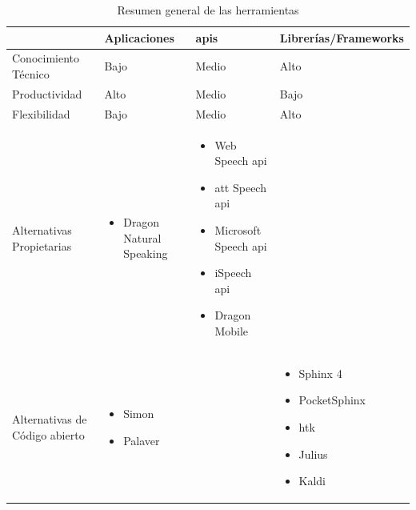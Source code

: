 \begin{table}[H]
\centering
\footnotesize
\begin{tabular}{|p{3.5cm}|>{\centering}p{3.5cm}|>{\centering}p{3.5cm}|>{\centering}p{3.5cm}|}
\hline
                               & Aplicaciones             &  \gls{api}s                            & Librer\'ias/Frameworks \tabularnewline
\hline
Conocimiento T\'ecnico         &     Bajo                    & Medio                            & Alto    \tabularnewline \hline
Productividad                  &     Alto                    & Medio                            & Bajo    \tabularnewline \hline
Flexibilidad                   &     Bajo                    & Medio                            & Alto    \tabularnewline \hline
Alternativas Propietarias      & \begin{itemize} \setlength{\itemsep}{1pt} \setlength{\parskip}{0pt} \setlength{\parsep}{0pt}\item Dragon Natural Speaking \end{itemize}  & \begin{itemize}  \setlength{\itemsep}{1pt} \setlength{\parskip}{0pt} \setlength{\parsep}{0pt} \item Web Speech \gls{api} \item \gls{att} Speech \gls{api} \item Microsoft Speech \gls{api} \item iSpeech \gls{api} \item Dragon Mobile \end{itemize}  &  \tabularnewline \hline
Alternativas de Código abierto & \begin{itemize}  \setlength{\itemsep}{1pt} \setlength{\parskip}{0pt} \setlength{\parsep}{0pt} \item Simon \item Palaver \end{itemize}          &           & \begin{itemize} \setlength{\itemsep}{1pt} \setlength{\parskip}{0pt} \setlength{\parsep}{0pt} \item Sphinx 4 \item PocketSphinx \item \gls{htk} \item Julius \item Kaldi \end{itemize} \tabularnewline
\hline
\end{tabular}
\caption{Resumen general de las herramientas}
\label{sec:resumen-herramientas}
\end{table}

